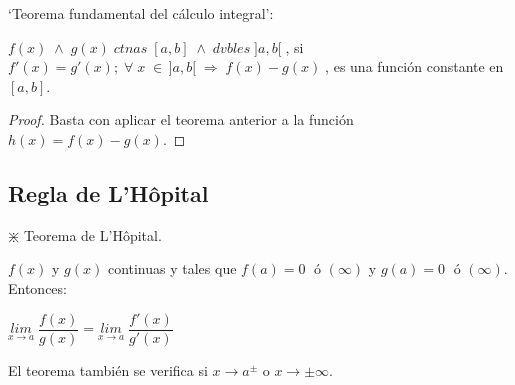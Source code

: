	\begin{coro} `Teorema fundamental del cálculo integral': 
	\label{teor:fdmtalCI}
		
		$f(x) \;  \wedge \; g(x) \; ctnas\;  [a,b]\; \wedge \;  dvbles \;  ]a,b[ \; $, si $f'(x)=g'(x); \; \forall \;x\; \in \,]a,b[ \; \Rightarrow \; f(x)-g(x)\;  $,  es una función constante en $[a,b]$.
		
	\end{coro}
	
	\begin{proof}
	Basta con aplicar el teorema anterior a la función $h(x)=f(x)-g(x)$.	
	\end{proof}


	
	\subsection{Regla de L'Hôpital}
	
	\begin{teor} $\divideontimes$ Teorema de L'Hôpital.
	
	$f(x)$ y $g(x)$ continuas y tales que $f(a)=0\; $ ó $(\infty)$  y $g(a)=0\; $ ó $(\infty)$. Entonces:
	
	$\underset {x\to a}{lim}\; {\dfrac {f(x)}{g(x)}}= \underset {x \to a}{lim}\; {\dfrac {f'(x)}{g'(x)}}$

	\end{teor}
	
	 El teorema también se verifica si $x\to a^{\pm} $ o $x\to \pm \infty$.
	 
